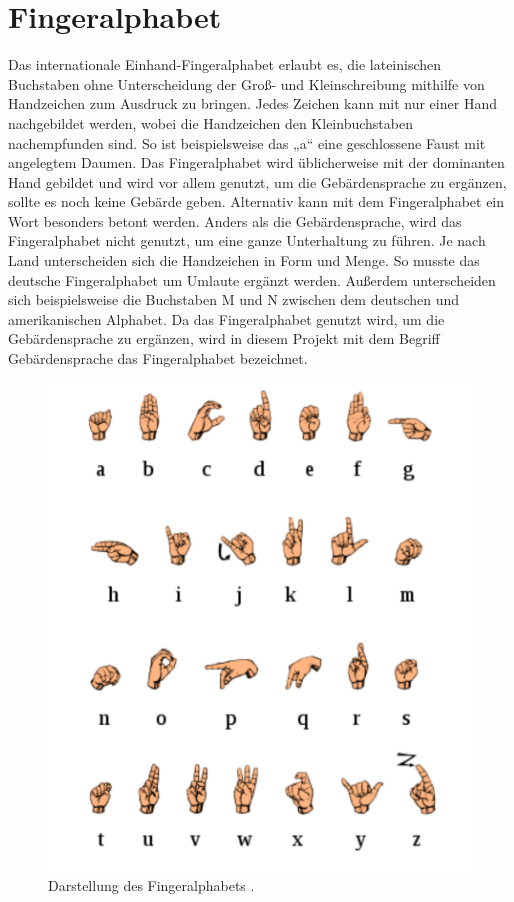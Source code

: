 \documentclass[11pt,bibliography=totocnumbered]{scrartcl}
\begin{document}
\section{Fingeralphabet}
\label{fingeralphabet}
Das internationale Einhand-Fingeralphabet erlaubt es, die lateinischen Buchstaben ohne Unterscheidung der Groß- und Kleinschreibung mithilfe von Handzeichen zum Ausdruck zu bringen. Jedes Zeichen kann mit nur einer Hand nachgebildet werden, wobei die Handzeichen den Kleinbuchstaben nachempfunden sind. So ist beispielsweise das „a“ eine geschlossene Faust mit angelegtem Daumen. Das Fingeralphabet wird üblicherweise mit der dominanten Hand gebildet und wird vor allem genutzt, um die Gebärdensprache zu ergänzen, sollte es noch keine Gebärde geben. Alternativ kann mit dem Fingeralphabet ein Wort besonders betont werden. Anders als die Gebärdensprache, wird das Fingeralphabet nicht genutzt, um eine ganze Unterhaltung zu führen.  Je nach Land unterscheiden sich die Handzeichen in Form und Menge. So musste das deutsche Fingeralphabet um Umlaute ergänzt werden. Außerdem unterscheiden sich beispielsweise die Buchstaben M und N zwischen dem deutschen und amerikanischen Alphabet. Da das Fingeralphabet genutzt wird, um die Gebärdensprache zu ergänzen, wird in diesem Projekt mit dem Begriff Gebärdensprache das Fingeralphabet bezeichnet.
\begin{figure}[H] 
	\centering
	\includegraphics[width=1.0\textwidth]{fingeralphabet}
	\caption[Fingeralphabet]{Darstellung des Fingeralphabets \cite{FINGERALPHABET}.}
	\label{fig:fingeralphabet}
\end{figure}
\end{document}
